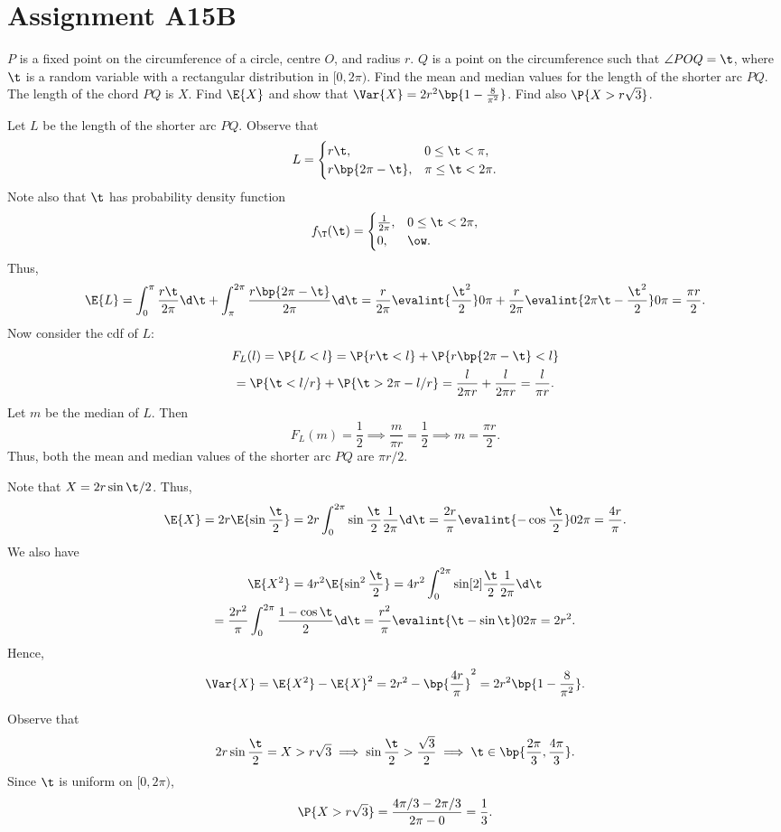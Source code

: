 \section{Assignment A15B}

\begin{problem}
    $P$ is a fixed point on the circumference of a circle, centre $O$, and radius $r$. $Q$ is a point on the circumference such that $\angle POQ =\t$, where $\t$ is a random variable with a rectangular distribution in $[0, 2\pi)$. Find the mean and median values for the length of the shorter arc $PQ$. The length of the chord $PQ$ is $X$. Find $\E{X}$ and show that $\Var{X} = 2r^2 \bp{1 - \frac8{\pi^2}}$. Find also $\P{X>r\sqrt3}$.
\end{problem}
\begin{solution}
    Let $L$ be the length of the shorter arc $PQ$. Observe that \[L = \begin{cases}
        r\t, & 0 \leq \t < \pi,\\
        r\bp{2\pi - \t}, & \pi \leq \t < 2\pi.
    \end{cases}\] Note also that $\t$ has probability density function \[f_{\T}(\t) = \begin{cases}
        \frac1{2\pi}, & 0 \leq \t < 2\pi,\\
        0, & \ow.
    \end{cases}\] Thus, \[\E{L} = \int_0^\pi \frac{r \t}{2\pi} \d \t + \int_\pi^{2\pi} \frac{r\bp{2\pi - \t}}{2\pi} \d \t = \frac{r}{2\pi} \evalint{\frac{\t^2}2}0\pi + \frac{r}{2\pi} \evalint{2\pi \t - \frac{\t^2}{2}}0\pi = \frac{\pi r}{2}.\] Now consider the cdf of $L$:
    \begin{gather*}
        F_L(l) = \P{L < l} = \P{r\t < l} + \P{r\bp{2\pi - \t} < l}\\
        = \P{\t < l/r} + \P{\t > 2\pi - l/r} = \frac{l}{2\pi r} + \frac{l}{2\pi r} = \frac{l}{\pi r}.
    \end{gather*}
    Let $m$ be the median of $L$. Then \[F_L(m) = \frac12 \implies \frac{m}{\pi r} = \frac12 \implies m = \frac{\pi r}{2}.\] Thus, both the mean and median values of the shorter arc $PQ$ are $\pi r/2$.

    Note that $X = 2r \sin{\t/2}$. Thus, \[\E{X} = 2r \E{\sin \frac\t2} = 2r \int_0^{2\pi} \sin{\frac\t2} \frac1{2\pi} \d \t = \frac{2r}{\pi} \evalint{-\cos \frac{\t}{2}}0{2\pi} = \frac{4r}{\pi}.\] We also have
    \begin{gather*}
        \E{X^2} = 4r^2 \E{\sin^2 \frac{\t}{2}} = 4r^2 \int_0^{2\pi} \sin[2]{\frac{\t}{2}} \frac1{2\pi} \d \t\\
        = \frac{2r^2}{\pi} \int_0^{2\pi} \frac{1 - \cos \t}{2} \d \t = \frac{r^2}{\pi} \evalint{\t - \sin \t}0{2\pi} = 2r^2.
    \end{gather*}
    Hence, \[\Var{X} = \E{X^2} - \E{X}^2 = 2r^2 - \bp{\frac{4r}{\pi}}^2 = 2r^2 \bp{1 - \frac{8}{\pi^2}}.\]

    Observe that \[2r \sin \frac\t2 = X > r\sqrt3 \implies \sin \frac\t2 > \frac{\sqrt3}{2} \implies \t \in \bp{\frac{2\pi}3, \frac{4\pi}3}.\] Since $\t$ is uniform on $[0, 2\pi)$, \[\P{X > r\sqrt{3}} = \frac{4\pi/3 - 2\pi/3}{2\pi - 0} = \frac13.\]
\end{solution}

